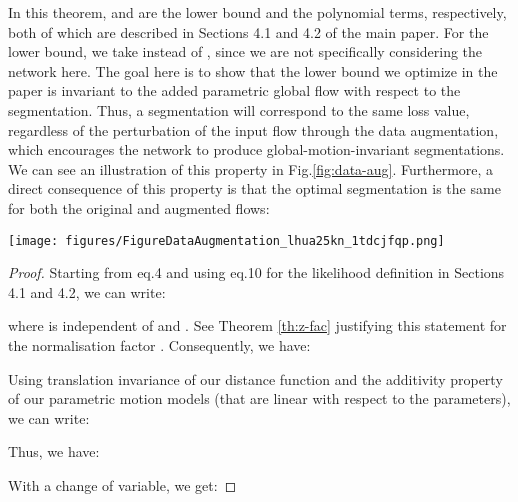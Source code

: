 \documentclass[10pt,twocolumn,letterpaper]{article}
\begin{document}
\begin{remark}
In this theorem,  and  are the lower bound and the polynomial terms, respectively, both of which are described in Sections 4.1 and 4.2 of the main paper. For the lower bound, we take  instead of , since we are not specifically considering the network here. The goal here is to show that the lower bound we optimize in the paper is invariant to the added parametric global flow with respect to the segmentation. Thus, a segmentation will correspond to the same loss value, regardless of the perturbation of the input flow through the data augmentation, which encourages the network to produce global-motion-invariant segmentations. We can see an illustration of this property in Fig.\ref{fig:data-aug}. Furthermore, a direct consequence of this property is that the optimal  segmentation is the same for both the original and augmented flows: 

\end{remark}

\vspace{0.2cm}

\begin{figure*}
\label{fig:data-aug}
\texttt{[image: figures/FigureDataAugmentation\_lhua25kn\_1tdcjfqp.png]}
\caption{Data augmentation adding a quadratic global motion on the optical flow field. From top to bottom : Optical flow field displayed with the usual HSV code \cite{middlebury}; Predicted mask with our network trained using data augmentation; Predicted mask with our network trained without data augmentation; Ground-truth segmentation mask.}
\end{figure*}

\begin{proof}

Starting from eq.4 and using eq.10 for the likelihood definition in Sections 4.1 and 4.2, we can write: 

where  is independent of  and . See Theorem \ref{th:z-fac} justifying this statement for the normalisation factor . Consequently, we have: 

Using translation invariance of our distance function  and the additivity property of our parametric motion models (that are linear with respect to the parameters), we can write: 

Thus, we have: 

With a change of variable, we get: 


\end{proof}
\end{document}
